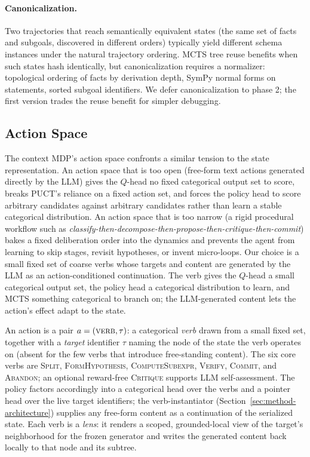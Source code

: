 \paragraph{Canonicalization.}
Two trajectories that reach semantically equivalent states (the same set
of facts and subgoals, discovered in different orders) typically yield
different schema instances under the natural trajectory ordering. MCTS
tree reuse benefits when such states hash identically, but
canonicalization requires a normalizer: topological ordering of facts by
derivation depth, SymPy normal forms on statements, sorted subgoal
identifiers. We defer canonicalization to phase 2; the first version
trades the reuse benefit for simpler debugging.

\subsection{Action Space}
\label{sec:method-actions}

The context MDP's action space confronts a similar tension to the state
representation. An action space that is too open (free-form text actions
generated directly by the LLM) gives the $Q$-head no fixed categorical
output set to score, breaks PUCT's reliance on a fixed action set, and
forces the policy head to score arbitrary candidates against arbitrary
candidates rather than learn a stable categorical distribution. An
action space that is too narrow (a rigid procedural workflow such as
\emph{classify-then-decompose-then-propose-then-critique-then-commit})
bakes a fixed deliberation order into the dynamics and prevents the
agent from learning to skip stages, revisit hypotheses, or invent
micro-loops. Our choice is a small fixed set of coarse verbs whose
targets and content are generated by the LLM as an action-conditioned
continuation. The verb gives the $Q$-head a small categorical output
set, the policy head a categorical distribution to learn, and MCTS
something categorical to branch on; the LLM-generated content lets the
action's effect adapt to the state.

\begin{definition}
\label{def:actionset}
An action is a pair $a = (\textsc{verb}, \tau)$: a categorical \emph{verb}
drawn from a small fixed set, together with a \emph{target} identifier
$\tau$ naming the node of the state the verb operates on (absent for the
few verbs that introduce free-standing content). The six core verbs are
\textsc{Split}, \textsc{FormHypothesis}, \textsc{ComputeSubexpr},
\textsc{Verify}, \textsc{Commit}, and \textsc{Abandon}; an optional
reward-free \textsc{Critique} supports LLM self-assessment. The policy
factors accordingly into a categorical head over the verbs and a pointer
head over the live target identifiers; the verb-instantiator
(Section~\ref{sec:method-architecture}) supplies any free-form content as
a continuation of the serialized state. Each verb is a \emph{lens}: it
renders a scoped, grounded-local view of the target's neighborhood for the
frozen generator and writes the generated content back locally to that node
and its subtree.
\end{definition}

